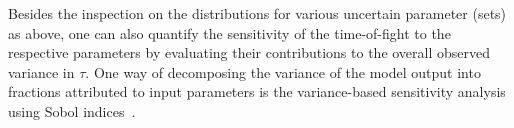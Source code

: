 \documentclass[%
 reprint,
superscriptaddress,
 amsmath,amssymb,
 aps,
prb,
floatfix
]{revtex4-2}
\newcommand{\bjoern}[2]{{\color{blue}{{\bf #1} #2}}}
\begin{document}

%
%


Besides the inspection on the distributions for various uncertain parameter (sets) as above, one can also quantify the sensitivity of the time-of-fight to the respective parameters by evaluating their contributions to the overall observed variance in $\tau$. One way of decomposing the variance of the model output into fractions attributed to input parameters is the variance-based sensitivity analysis using Sobol indices~\cite{saltelli_variance_2010}. 
\end{document}
